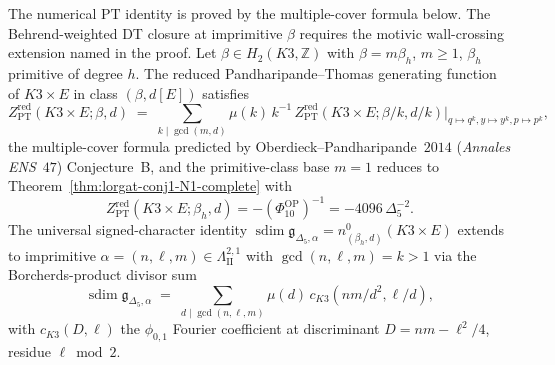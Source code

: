 \begin{theorem}
\label{thm:k3e-imprimitive-DT-OP2014-B}
The numerical $\mathrm{PT}$ identity is proved by the multiple-cover
formula below. The Behrend-weighted DT closure at imprimitive $\beta$
requires the motivic wall-crossing extension named in the proof.
Let $\beta \in H_2(K3, \mathbb{Z})$ with $\beta = m \beta_h$, $m \geq 1$, $\beta_h$ primitive of degree $h$. The reduced Pandharipande--Thomas generating function of $K3 \times E$ in class $(\beta, d[E])$ satisfies
\begin{equation}
\label{eq:k3e-imprimitive-PT}
Z^{\mathrm{red}}_{\mathrm{PT}}(K3 \times E; \beta, d) \;=\; \sum_{k \mid \gcd(m, d)} \mu(k)\, k^{-1}\, Z^{\mathrm{red}}_{\mathrm{PT}}(K3 \times E; \beta/k, d/k)\bigl|_{q \mapsto q^k, y \mapsto y^k, p \mapsto p^k},
\end{equation}
the multiple-cover formula predicted by Oberdieck--Pandharipande~$2014$ (\emph{Annales ENS}~$47$) Conjecture~B, and the primitive-class base \(m = 1\) reduces to Theorem~\ref{thm:lorgat-conj1-N1-complete} with
\[
Z^{\mathrm{red}}_{\mathrm{PT}}(K3 \times E; \beta_h, d)
=-(\Phi_{10}^{\mathrm{OP}})^{-1}
=-4096\,\Delta_5^{-2}.
\]
The universal signed-character identity \(\operatorname{sdim}\mathfrak g_{\Delta_5,\alpha} = n^0_{(\beta_h, d)}(K3 \times E)\) extends to imprimitive \(\alpha = (n, \ell, m) \in \Lambda^{2, 1}_{\mathrm{II}}\) with \(\gcd(n, \ell, m) = k > 1\) via the Borcherds-product divisor sum
\begin{equation}
\label{eq:k3e-imprimitive-mult}
\operatorname{sdim}\mathfrak g_{\Delta_5,\alpha} \;=\; \sum_{d \mid \gcd(n, \ell, m)} \mu(d)\, c_{K3}(nm/d^2, \ell/d),
\end{equation}
with $c_{K3}(D, \ell)$ the $\phi_{0, 1}$ Fourier coefficient at discriminant $D = nm - \ell^2/4$, residue $\ell \bmod 2$.
\end{theorem}

